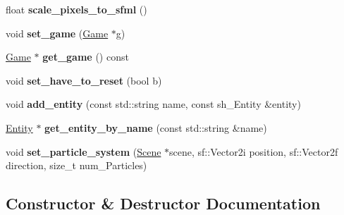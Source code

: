 \begin{DoxyCompactItemize}
\item 
\mbox{\label{classexample_1_1_scene_a3e746bedf9e26c8284a7d26524140b37}} 
float {\bfseries scale\+\_\+pixels\+\_\+to\+\_\+sfml} ()
\item 
\mbox{\label{classexample_1_1_scene_a5b5b9cac22eb646b11638826f665443a}} 
void {\bfseries set\+\_\+game} (\mbox{\hyperlink{classexample_1_1_game}{Game}} $\ast$g)
\item 
\mbox{\label{classexample_1_1_scene_ad25de930868da9c2da3850603327454b}} 
\mbox{\hyperlink{classexample_1_1_game}{Game}} $\ast$ {\bfseries get\+\_\+game} () const
\item 
\mbox{\label{classexample_1_1_scene_aef7c8aa7d2e11e950af439b8e5a45e1d}} 
void {\bfseries set\+\_\+have\+\_\+to\+\_\+reset} (bool b)
\item 
\mbox{\label{classexample_1_1_scene_a2d5d63db1f3b6f1b2c50d4c8f9a9a214}} 
void {\bfseries add\+\_\+entity} (const std\+::string name, const sh\+\_\+\+Entity \&entity)
\item 
\mbox{\label{classexample_1_1_scene_aa70b6f4d4ceb7fe2200622f9527a7ee8}} 
\mbox{\hyperlink{classexample_1_1_entity}{Entity}} $\ast$ {\bfseries get\+\_\+entity\+\_\+by\+\_\+name} (const std\+::string \&name)
\item 
\mbox{\label{classexample_1_1_scene_a2683af25615bc76b92ce5f14c160ee22}} 
void {\bfseries set\+\_\+particle\+\_\+system} (\mbox{\hyperlink{classexample_1_1_scene}{Scene}} $\ast$scene, sf\+::\+Vector2i position, sf\+::\+Vector2f direction, size\+\_\+t num\+\_\+\+Particles)
\end{DoxyCompactItemize}


\subsection{Constructor \& Destructor Documentation}
\mbox{\label{classexample_1_1_scene_a1fe6da262ba4c25503c19eb5e8637190}} 
